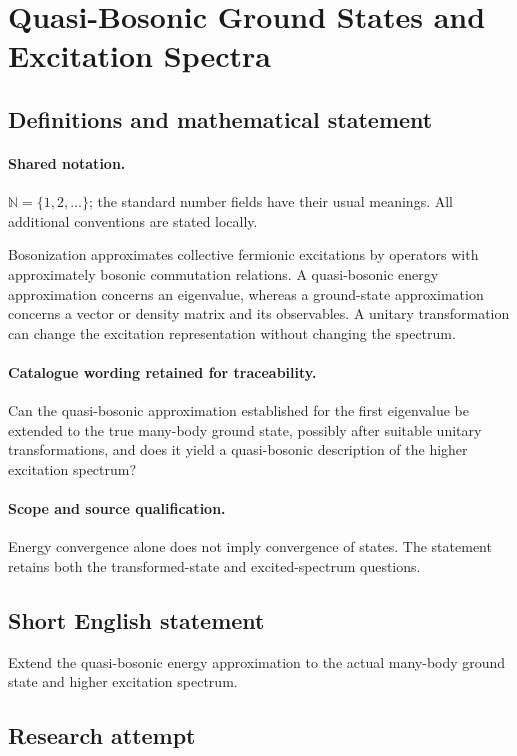 \documentclass[11pt]{article}
\begin{document}
\section{Quasi-Bosonic Ground States and Excitation Spectra}\label{statement}

\subsection{Definitions and mathematical statement}

\paragraph{Shared notation.}$\mathbb N=\{1,2,\ldots\}$; the standard number fields have their usual meanings. All additional conventions are stated locally.


Bosonization approximates collective fermionic excitations by operators with approximately bosonic commutation relations. A quasi-bosonic energy approximation concerns an eigenvalue, whereas a ground-state approximation concerns a vector or density matrix and its observables. A unitary transformation can change the excitation representation without changing the spectrum.

\paragraph{Catalogue wording retained for traceability.}
Can the quasi-bosonic approximation established for the first eigenvalue be extended to the true many-body ground state, possibly after suitable unitary transformations, and does it yield a quasi-bosonic description of the higher excitation spectrum?

\paragraph{Scope and source qualification.}Energy convergence alone does not imply convergence of states. The statement retains both the transformed-state and excited-spectrum questions.
\subsection{Short English statement}
Extend the quasi-bosonic energy approximation to the actual many-body ground state and higher excitation spectrum.
\subsection{Research attempt}
\end{document}
